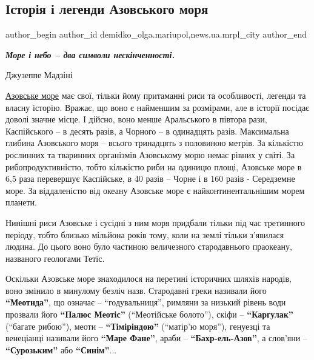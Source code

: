  
 
 
 
 
 
\subsection{Історія і легенди Азовського моря}
\label{sec:23_06_2018.stz.news.ua.mrpl_city.1.istoria_i_legendy_azovskogo}
 
\ifcmt
 author_begin
   author_id demidko_olga.mariupol,news.ua.mrpl_city
 author_end
\fi

\begin{raggedright}
\bfseries\em\color{blue}
Море і небо – два символи нескінченності.

Джузеппе Мадзіні
\end{raggedright}

\href{https://kirillovka.ks.ua/azov-sea/}{Азовське море} має свої, тільки йому притаманні риси та особливості, легенди та
власну історію. Вражає, що воно є найменшим за розмірами, але в історії посідає
доволі значне місце. І дійсно, воно менше Аральського в півтора рази,
Каспійського – в десять разів, а Чорного – в одинадцять разів. Максимальна
глибина Азовського моря – всього тринадцять з половиною метрів. За кількістю
рослинних та тваринних організмів Азовському морю немає рівних у світі. За
рибопродуктивністю, тобто кількістю риби на одиницю площі, Азовське море в 6,5
раза перевершує Каспійське, в 40 разів – Чорне і в 160 разів - Середземне море.
За віддаленістю від океану Азовське море є найконтинентальнішим морем планети.


Нинішні риси Азовське і сусідні з ним моря придбали тільки під час третинного
періоду, тобто близько мільйона років тому, коли на землі тільки з'явилася
людина. До цього воно було частиною величезного стародавнього праокеану,
названого геологами Тетіс.

Оскільки Азовське море знаходилося на перетині історичних шляхів народів, воно
змінило в минулому безліч назв. Стародавні греки називали його \textbf{\enquote{Меотида}}, що
означає – \enquote{годувальниця}, римляни за низький рівень води прозвали його \textbf{\enquote{Палюс
Меотіс}} (\enquote{Меотійське болото}), скіфи – \textbf{\enquote{Каргулак}} (\enquote{багате рибою}), меоти –
\textbf{\enquote{Тіміріндою}} (\enquote{матір'ю моря}), генуезці та венеціанці називали його \textbf{\enquote{Маре
Фане}}, араби – \textbf{\enquote{Бахр-ель-Азов}}, а слов'яни – \textbf{\enquote{Сурозьким}} або \textbf{\enquote{Синім}}...

